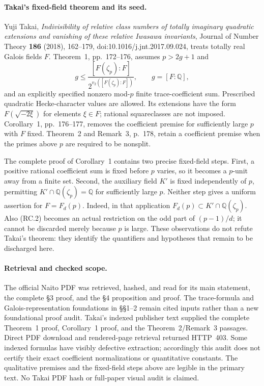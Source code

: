\paragraph{Takai's fixed-field theorem and its seed.}
Yuji Takai, \emph{Indivisibility of relative class numbers of totally
imaginary quadratic extensions and vanishing of these relative Iwasawa
invariants}, Journal of Number Theory \textbf{186} (2018), 162--179,
doi:10.1016/j.jnt.2017.09.024, treats totally real Galois fields $F$.
Theorem~1, pp.~172--176, assumes $p>2g+1$ and
\[
 g\leq \frac{[F(\zeta_p):F]}
                 {2^{v_2([F(\zeta_p):F])}},\qquad g=[F:\mathbb Q],
                                                               \tag{RC.2}
\]
and an explicitly specified nonzero mod-$p$ finite trace-coefficient
sum.  Prescribed quadratic Hecke-character values are allowed.  Its
extensions have the form $F(\sqrt{-2\xi})$ for elements $\xi\in F$;
rational squareclasses are not imposed.  Corollary~1, pp.~176--177,
removes the coefficient premise for sufficiently large $p$ with $F$
fixed.  Theorem~2 and Remark~3, p.~178, retain a coefficient premise
when the primes above $p$ are required to be nonsplit.

The complete proof of Corollary~1 contains two precise fixed-field
steps.  First, a positive rational coefficient sum is fixed before
$p$ varies, so it becomes a $p$-unit away from a finite set.  Second,
the auxiliary field $K'$ is fixed independently of $p$, permitting
$K'\cap\mathbb Q(\zeta_p)=\mathbb Q$ for sufficiently large $p$.
Neither step gives a uniform assertion for $F=F_d(p)$.  Indeed, in
that application $F_d(p)\subset K'\cap\mathbb Q(\zeta_p)$.
Also (RC.2) becomes an actual restriction on the odd part of
$(p-1)/d$; it cannot be discarded merely because $p$ is large.
These observations do not refute Takai's theorem: they identify the
quantifiers and hypotheses that remain to be discharged here.

\paragraph{Retrieval and checked scope.}
The official Naito PDF was retrieved, hashed, and read for its main
statement, the complete \S3 proof, and the \S4 proposition and proof.
The trace-formula and Galois-representation foundations in \S\S1--2
remain cited inputs rather than a new foundational proof audit.
Takai's indexed publisher text supplied the complete Theorem~1 proof,
Corollary~1 proof, and the Theorem~2/Remark~3 passages.  Direct PDF
download and rendered-page retrieval returned HTTP~403.  Some indexed
formulas have visibly defective extraction; accordingly this audit
does not certify their exact coefficient normalizations or quantitative
constants.  The qualitative premises and the fixed-field steps above
are legible in the primary text.  No Takai PDF hash or full-paper
visual audit is claimed.

